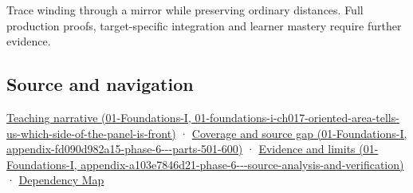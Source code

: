 Trace winding through a mirror while preserving ordinary distances. Full production proofs, target-specific integration and learner mastery require further evidence.

\subsection{Source and navigation}\label{appendix-87d7626c8d37-source-and-navigation}

\href{../01-Foundations-I/main.pdf\#nameddest=01-foundations-i-ch017-oriented-area-tells-us-which-side-of-the-panel-is-front}{Teaching narrative (01-Foundations-I, 01-foundations-i-ch017-oriented-area-tells-us-which-side-of-the-panel-is-front)} · \href{../01-Foundations-I/main.pdf\#nameddest=appendix-fd090d982a15-phase-6---parts-501-600}{Coverage and source gap (01-Foundations-I, appendix-fd090d982a15-phase-6-\/-\/-parts-501-600)} · \href{../01-Foundations-I/main.pdf\#nameddest=appendix-a103e7846d21-phase-6---source-analysis-and-verification}{Evidence and limits (01-Foundations-I, appendix-a103e7846d21-phase-6-\/-\/-source-analysis-and-verification)} · \hyperref[appendix-4ad47bdd269a]{Dependency Map}
